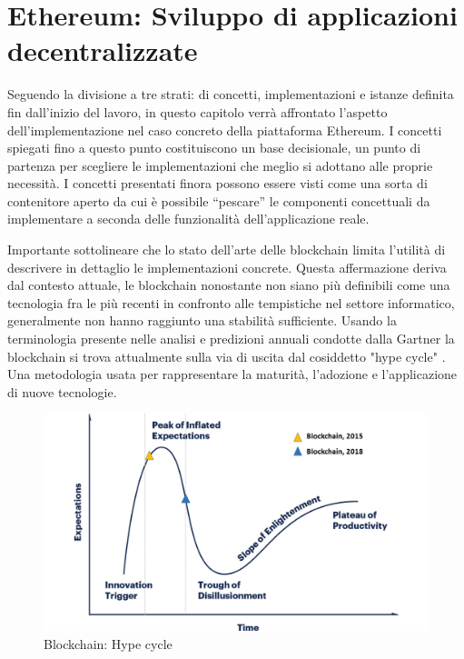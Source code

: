 \chapter{Ethereum: Sviluppo di applicazioni decentralizzate}

Seguendo la divisione a tre strati: di concetti, implementazioni e istanze definita fin dall'inizio del lavoro, in questo capitolo verrà affrontato l'aspetto dell'implementazione nel caso concreto della piattaforma Ethereum. I concetti spiegati fino a questo punto costituiscono un base decisionale, un punto di partenza per scegliere le implementazioni che meglio si adottano alle proprie necessità. I concetti presentati finora possono essere visti come una sorta di contenitore aperto da cui è possibile “pescare” le componenti concettuali da implementare a seconda delle funzionalità dell’applicazione reale. 

Importante sottolineare che lo stato dell'arte delle blockchain limita l’utilità di descrivere in dettaglio le implementazioni concrete. Questa affermazione deriva dal contesto attuale, le blockchain nonostante non siano più definibili come una tecnologia fra le più recenti in confronto alle tempistiche nel settore informatico, generalmente non hanno raggiunto una stabilità sufficiente. Usando la terminologia presente nelle analisi e predizioni annuali condotte dalla Gartner la blockchain si trova attualmente sulla via di uscita dal cosiddetto "hype cycle" \smallskip {}. Una metodologia usata per rappresentare la maturità, l'adozione e l'applicazione di nuove tecnologie.

\begin{figure}[H]
\centering
\includegraphics[width=1\textwidth]{immagini/blockchainHype.png}
\caption{Blockchain: Hype cycle}
\label{fig:mesh7}
\end{figure}


